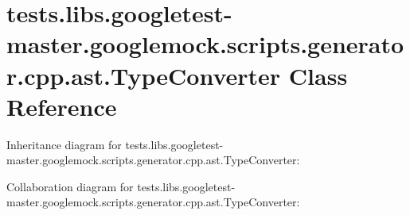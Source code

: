 \hypertarget{classtests_1_1libs_1_1googletest-master_1_1googlemock_1_1scripts_1_1generator_1_1cpp_1_1ast_1_1TypeConverter}{}\section{tests.\+libs.\+googletest-\/master.googlemock.\+scripts.\+generator.\+cpp.\+ast.\+Type\+Converter Class Reference}
\label{classtests_1_1libs_1_1googletest-master_1_1googlemock_1_1scripts_1_1generator_1_1cpp_1_1ast_1_1TypeConverter}


Inheritance diagram for tests.\+libs.\+googletest-\/master.googlemock.\+scripts.\+generator.\+cpp.\+ast.\+Type\+Converter\+:


Collaboration diagram for tests.\+libs.\+googletest-\/master.googlemock.\+scripts.\+generator.\+cpp.\+ast.\+Type\+Converter\+:
